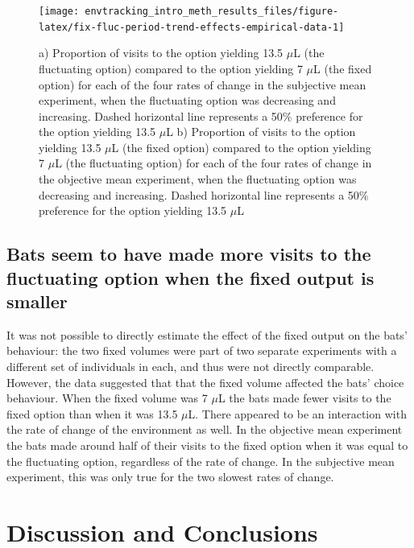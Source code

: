 \documentclass[
]{article}
\begin{document}
\begin{figure}[H]

{\centering \texttt{[image: envtracking\_intro\_meth\_results\_files/figure-latex/fix-fluc-period-trend-effects-empirical-data-1]} 

}

\caption{a) Proportion of visits to the option yielding 13.5 \(\mu\)L (the fluctuating option) compared to the option yielding 7 \(\mu\)L (the fixed option) for each of the four rates of change in the subjective mean experiment, when the fluctuating option was decreasing and increasing. Dashed horizontal line represents a 50\% preference for the option yielding 13.5 \(\mu\)L b) Proportion of visits to the option yielding 13.5 \(\mu\)L (the fixed option) compared to the option yielding 7 \(\mu\)L (the fluctuating option) for each of the four rates of change in the objective mean experiment, when the fluctuating option was decreasing and increasing. Dashed horizontal line represents a 50\% preference for the option yielding 13.5 \(\mu\)L}\label{fig:fix-fluc-period-trend-effects-empirical-data}
\end{figure}

\hypertarget{bats-seem-to-have-made-more-visits-to-the-fluctuating-option-when-the-fixed-output-is-smaller}{%
\subsection{Bats seem to have made more visits to the fluctuating option when the fixed output is smaller}\label{bats-seem-to-have-made-more-visits-to-the-fluctuating-option-when-the-fixed-output-is-smaller}}

It was not possible to directly estimate the effect of the fixed output on the bats' behaviour: the two fixed volumes were part of two separate experiments with a different set of individuals in each, and thus were not directly comparable. However, the data suggested that that the fixed volume affected the bats' choice behaviour. When the fixed volume was 7 \(\mu\)L the bats made fewer visits to the fixed option than when it was 13.5 \(\mu\)L. There appeared to be an interaction with the rate of change of the environment as well. In the objective mean experiment the bats made around half of their visits to the fixed option when it was equal to the fluctuating option, regardless of the rate of change. In the subjective mean experiment, this was only true for the two slowest rates of change.

\hypertarget{discussion-and-conclusions}{%
\section{Discussion and Conclusions}\label{discussion-and-conclusions}}
\end{document}

